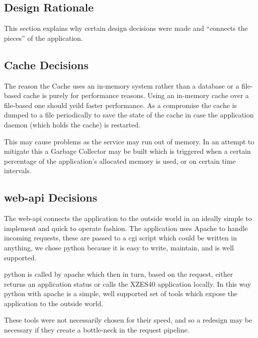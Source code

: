 \begin{enmerate}
\begin{itemzie}
\section{Design Rationale}

This section explains why certain design decisions were made and ``connects the pieces'' of the application.

\subsection{Cache Decisions}

The reason the Cache uses an in-memory system rather than a database or a file-based cache is purely for performance reasons.
Using an in-memory cache over a file-based one should yeild faster performance.
As a compromise the cache is dumped to a file periodically to save the state of the cache in case the application daemon (which holds the cache) is restarted.

This may cause problems as the service may run out of memory.
In an attempt to mitigate this a Garbage Collector may be built which is triggered when a certain percentage of the application's allocated memory is used, or on certain time intervals.
 
\subsection{\gls{web-api} Decisions}

The \gls{web-api} connects the application to the outside world in an ideally simple to implement and quick to operate fashion.
The application uses Apache to handle incoming requests, these are passed to a \gls{cgi} script which could be written in anything, we chose \gls{python} because it is easy to write, maintain, and is well supported.

\gls{python} is called by \gls{apache} which then in turn, based on the request, either returns an application status or calls the XZES40 application locally.
In this way \gls{python} with \gls{apache} is a simple, well supported set of tools which expose the application to the outside world.

These tools were not necessarily chosen for their speed, and so a redesign may be necessary if they create a bottle-neck in the request pipeline.


\end{itemzie}
\end{enmerate}
